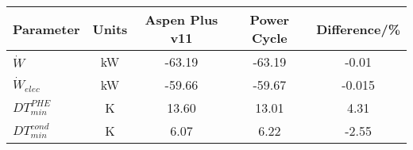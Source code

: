 \begin{tabular}{|p{3cm} c c c c|}
    \hline
    \rowcolor{bluepoli!40} %
    \textbf{Parameter} & \textbf{Units} & \textbf{Aspen Plus v11} & \textbf{Power Cycle} & \textbf{Difference/\unit{\percent}} \T\B \\
    \hline \hline
    \(\Dot{W}\) & \unit{\kilo\watt} & -63.19 & -63.19 & -0.01 \T\B\\
    \(\Dot{W}_{elec}\) & \unit{\kilo\watt} & -59.66 & -59.67 & -0.015 \T\B\\
    \(DT_{min}^{PHE}\) & \unit{\K} & 13.60 & 13.01 & 4.31 \T\B\\
    \(DT_{min}^{cond}\) & \unit{\K} & 6.07 & 6.22 & -2.55 \T\B\\
    \hline
\end{tabular}